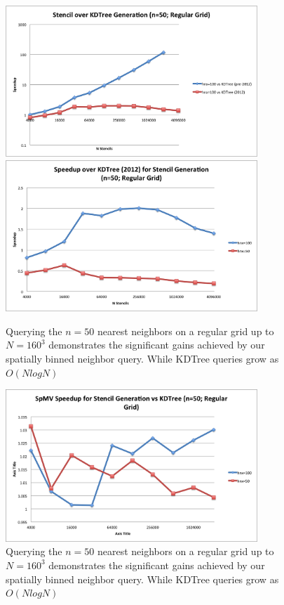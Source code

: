 \documentclass[11pt]{report}
\begin{document}
\begin{figure}
\centering
\includegraphics[width=9.5cm]{../figures/stencils/kdtree_old_reg_subsets_4m_stencil_gen_speedup.png}
\includegraphics[width=9.5cm]{../figures/stencils/reg_subsets_4m_stencil_gen_speedup.png}
\caption{Querying the $n=50$ nearest neighbors on a regular grid up to $N=160^3$ demonstrates the significant gains achieved by our spatially binned neighbor query. While KDTree queries grow as $O(N log N)$}
\label{fig:hash_results}
\end{figure}
\begin{figure}
\centering
\includegraphics[width=9.5cm]{../figures/stencils/reg_subsets_2m_spmv_speedup.png}
\caption{Querying the $n=50$ nearest neighbors on a regular grid up to $N=160^3$ demonstrates the significant gains achieved by our spatially binned neighbor query. While KDTree queries grow as $O(N log N)$}
\label{fig:hash_results}
\end{figure}
\end{document}
